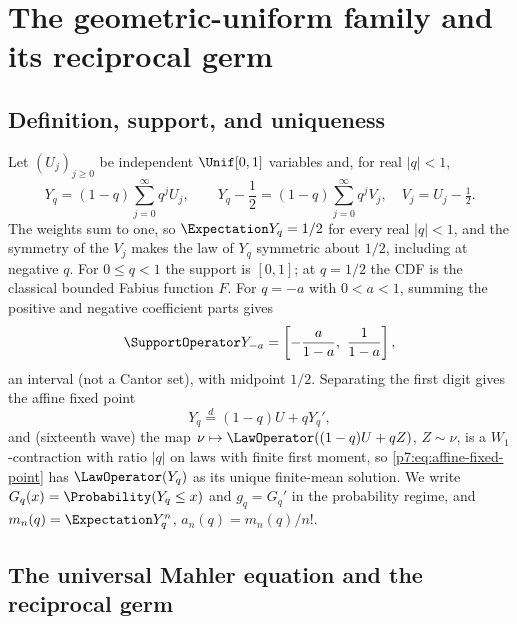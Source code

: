 \documentclass[11pt,oneside]{article}
\numberwithin{equation}{section}
\theoremstyle{definition}
\theoremstyle{remark}
\begin{document}
\section{The geometric-uniform family and its reciprocal germ}
\label{p7:sec:germ}

\subsection{Definition, support, and uniqueness}

Let $(U_j)_{j\ge0}$ be independent $\Unif[0,1]$ variables and, for real
$|q|<1$,
\begin{equation}\label{p7:eq:Yq}
 Y_q=(1-q)\sum_{j=0}^{\infty}q^jU_j,
 \qquad
 Y_q-\frac12=(1-q)\sum_{j=0}^{\infty}q^jV_j,
 \quad V_j=U_j-\tfrac12.
\end{equation}
The weights sum to one, so $\Expectation Y_q=1/2$ for every real $|q|<1$, and the
symmetry of the $V_j$ makes the law of $Y_q$ symmetric about $1/2$, including
at negative $q$.  For $0\le q<1$ the support is $[0,1]$; at $q=1/2$ the CDF is
the classical bounded Fabius function $F$.  For $q=-a$ with $0<a<1$, summing
the positive and negative coefficient parts gives
\begin{equation}\label{p7:eq:negative-support}
 \SupportOperator Y_{-a}=\left[-\frac a{1-a},\ \frac1{1-a}\right],
\end{equation}
an interval (not a Cantor set), with midpoint $1/2$.  Separating the first
digit gives the affine fixed point
\begin{equation}\label{p7:eq:affine-fixed-point}
 Y_q\overset d=(1-q)U+qY_q',
\end{equation}
and (sixteenth wave) the map
$\nu\mapsto\LawOperator((1-q)U+qZ)$, $Z\sim\nu$, is a $W_1$-contraction with ratio
$|q|$ on laws with finite first moment, so \eqref{p7:eq:affine-fixed-point}
has $\LawOperator(Y_q)$ as its unique finite-mean solution.  We write
$G_q(x)=\Probability(Y_q\le x)$ and $g_q=G_q'$ in the probability regime, and
$m_n(q)=\Expectation Y_q^n$, $a_n(q)=m_n(q)/n!$.

\subsection{The universal Mahler equation and the reciprocal germ}
\end{document}
